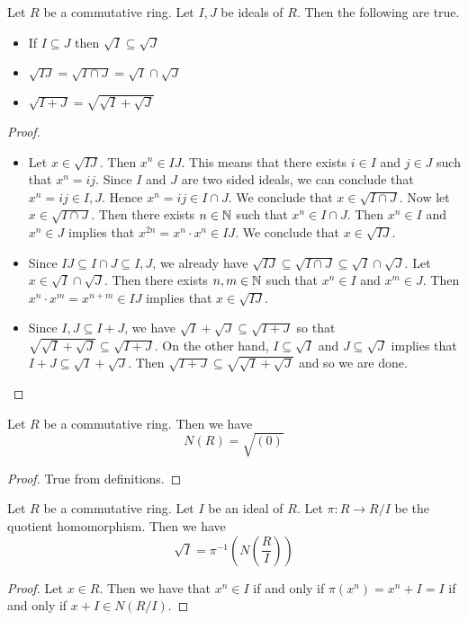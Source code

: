 \documentclass[a4paper]{article}
\begin{document}
\begin{prp}{}{} Let $R$ be a commutative ring. Let $I,J$ be ideals of $R$. Then the following are true. 
\begin{itemize}
\item If $I\subseteq J$ then $\sqrt{I}\subseteq\sqrt{J}$
\item $\sqrt{IJ}=\sqrt{I\cap J}=\sqrt{I}\cap\sqrt{J}$
\item $\sqrt{I+J}=\sqrt{\sqrt{I}+\sqrt{J}}$
\end{itemize} \tcbline
\begin{proof}~\\
\begin{itemize}
\item Let $x\in\sqrt{IJ}$. Then $x^n\in IJ$. This means that there exists $i\in I$ and $j\in J$ such that $x^n=ij$. Since $I$ and $J$ are two sided ideals, we can conclude that $x^n=ij\in I,J$. Hence $x^n=ij\in I\cap J$. We conclude that $x\in\sqrt{I\cap J}$. Now let $x\in\sqrt{I\cap J}$. Then there exists $n\in\mathbb{N}$ such that $x^n\in I\cap J$. Then $x^n\in I$ and $x^n\in J$ implies that $x^{2n}=x^n\cdot x^n\in IJ$. We conclude that $x\in\sqrt{IJ}$. 
\item Since $IJ\subseteq I\cap J\subseteq I,J$, we already have $\sqrt{IJ}\subseteq\sqrt{I\cap J}\subseteq\sqrt{I}\cap\sqrt{J}$. Let $x\in\sqrt{I}\cap\sqrt{J}$. Then there exists $n,m\in\mathbb{N}$ such that $x^n\in I$ and $x^m\in J$. Then $x^n\cdot x^m=x^{n+m}\in IJ$ implies that $x\in\sqrt{IJ}$. 
\item Since $I,J\subseteq I+J$, we have $\sqrt{I}+\sqrt{J}\subseteq\sqrt{I+J}$ so that $\sqrt{\sqrt{I}+\sqrt{J}}\subseteq\sqrt{I+J}$. On the other hand, $I\subseteq\sqrt{I}$ and $J\subseteq\sqrt{J}$ implies that $I+J\subseteq\sqrt{I}+\sqrt{J}$. Then $\sqrt{I+J}\subseteq\sqrt{\sqrt{I}+\sqrt{J}}$ and so we are done. 
\end{itemize}
\end{proof}
\end{prp}

\begin{lmm}{}{} Let $R$ be a commutative ring. Then we have $$N(R)=\sqrt{(0)}$$ \tcbline
\begin{proof}
True from definitions. 
\end{proof}
\end{lmm}

\begin{lmm}{}{} Let $R$ be a commutative ring. Let $I$ be an ideal of $R$. Let $\pi:R\to R/I$ be the quotient homomorphism. Then we have $$\sqrt{I}=\pi^{-1}\left(N\left(\frac{R}{I}\right)\right)$$ \tcbline
\begin{proof}
Let $x\in R$. Then we have that $x^n\in I$ if and only if $\pi(x^n)=x^n+I=I$ if and only if $x+I\in N(R/I)$. 
\end{proof}
\end{lmm}
\end{document}
